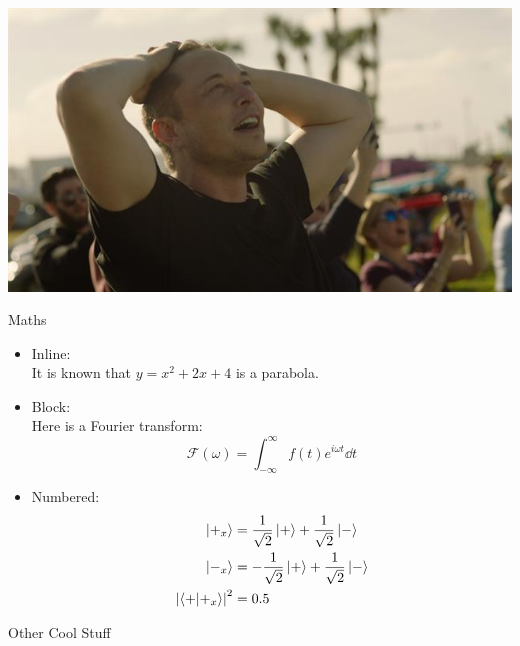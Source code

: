 \documentclass[10pt]{beamer}
\begin{document}
\begin{frame}
\centering
    \includegraphics[width=\textwidth]{oohyeah}
\end{frame}
\begin{frame}{Maths}
\begin{itemize}
    \item Inline:\\
    It is known that $y=x^2+2x+4$ is a parabola.\par
    \item Block:\\
    Here is a Fourier transform:
    \[\mathcal{F}\left(\omega\right)=\int_{-\infty}^\infty f(t) e^{i\omega t}\dd t\]
    \item Numbered:
    \begin{subequations}
    \begin{align}
        \ket{+_x} &= \frac{1}{\sqrt{2}} \ket{+} + \frac{1}{\sqrt{2}} \ket{-}\\
        \ket{-_x} &= -\frac{1}{\sqrt{2}} \ket{+} + \frac{1}{\sqrt{2}} \ket{-}\\
        \abs{\braket{+}{+_x}}^2 &= 0.5
    \end{align}
    \end{subequations}
\end{itemize}


\end{frame}
\begin{frame}{Other Cool Stuff}
\centering
\end{frame}
\end{document}

